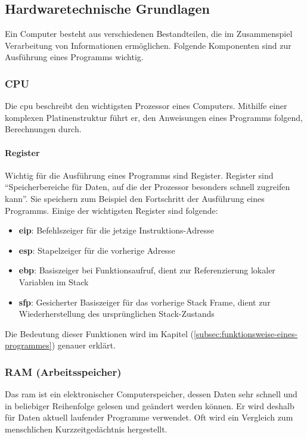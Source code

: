 \documentclass[11pt, a4paper]{article}
\begin{document}
\subsection{Hardwaretechnische Grundlagen}
Ein Computer besteht aus verschiedenen Bestandteilen, die im Zusammenspiel Verarbeitung von Informationen ermöglichen. Folgende Komponenten sind zur Ausführung eines Programms wichtig.
\subsubsection{CPU}\label{subsubsec:cpu}
Die \gls{cpu} beschreibt den wichtigsten Prozessor eines Computers. Mithilfe einer komplexen Platinenstruktur führt er, den Anweisungen eines Programms folgend, Berechnungen durch. 
\paragraph{Register}
Wichtig für die Ausführung eines Programms sind Register. Register sind ``Speicherbereiche für Daten, auf die der Prozessor besonders schnell zugreifen kann''. \cite{RegisterWikipedia:online} Sie speichern zum Beispiel den Fortschritt der Ausführung eines Programms. Einige der wichtigsten Register sind folgende:
\begin{itemize}
	\item \textbf{\gls{eip}}: Befehlszeiger für die jetzige Instruktions-Adresse \cite{UsefulRe7:online}
	\item \textbf{\gls{esp}}: Stapelzeiger für die vorherige Adresse \cite{UsefulRe7:online}
	\item \textbf{\gls{ebp}}: Basiszeiger bei Funktionsaufruf, dient zur Referenzierung lokaler Variablen im Stack \cite{UsefulRe7:online}
	\item \textbf{\gls{sfp}}: Gesicherter Basiszeiger für das vorherige Stack Frame, dient zur Wiederherstellung des ursprünglichen Stack-Zustands \cite{UsefulRe7:online}
\end{itemize}

Die Bedeutung dieser Funktionen wird im Kapitel  (\ref{subsec:funktionsweise-eines-programmes}) genauer erklärt.
\subsubsection{RAM (Arbeitsspeicher)}
Das \gls{ram} ist ein elektronischer Computerspeicher, dessen Daten sehr schnell und in beliebiger Reihenfolge gelesen und geändert werden können. Er wird deshalb für Daten aktuell laufender Programme verwendet. Oft wird ein Vergleich zum menschlichen Kurzzeitgedächtnis hergestellt. 
\end{document}
